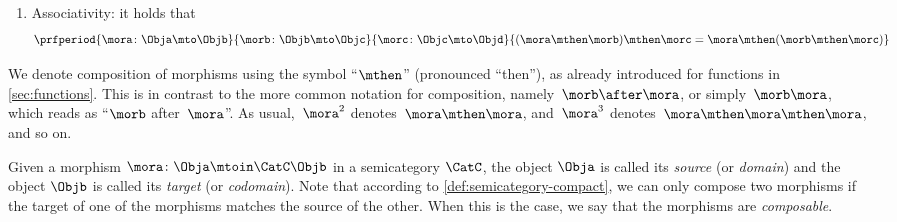 \begin{ctdefinition}[Semicategory]
\begin{body}
        \condit
        \begin{enumerate}
            \item Associativity: it holds that
                  \begin{equation}
                      \prfperiod{
                          \mora\colon \Obja \mto \Objb
                      }{
                          \morb\colon \Objb \mto \Objc
                      }{
                          \morc\colon \Objc \mto \Objd
                      }{
                          (\mora\mthen \morb)
                          \mthen \morc= \mora \mthen (\morb \mthen \morc)
                      }
                  \end{equation}
        \end{enumerate}
    \end{body}
\end{ctdefinition}

\begin{remark}
    We denote composition of morphisms using the symbol ``$\mthen$'' (pronounced ``then''), as already introduced for functions in \cref{sec:functions}.
    This is in contrast to the more common notation for composition, namely~$\morb\after \mora$, or simply~$\morb \mora$, which reads as ``$\morb$ after~$\mora$''.
    As usual,~$\mora^2$ denotes~$\mora \mthen \mora$, and~$\mora^3$ denotes~$\mora \mthen \mora \mthen \mora$, and so on.
\end{remark}


Given a morphism $\mora \colon \Obja \mtoin\CatC \Objb$ in a semicategory $\CatC$, the object $\Obja$ is called its \emph{source} (or \emph{domain}) and the object $\Objb$ is called its \emph{target} (or \emph{codomain}).
Note that according to \cref{def:semicategory-compact}, we can only compose two morphisms if the target of one of the morphisms matches the source of the other.
When this is the case, we say that the morphisms are \emph{composable}.


